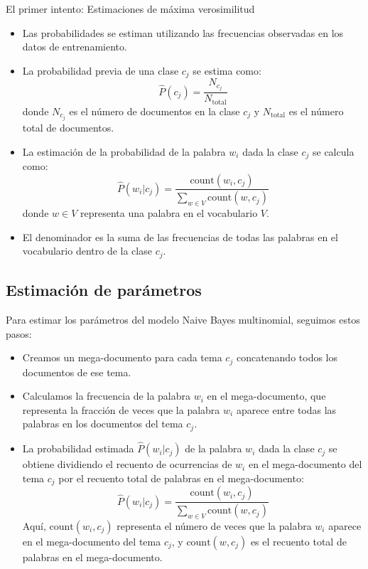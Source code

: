 El primer intento: Estimaciones de máxima verosimilitud
\begin{itemize}
    \item Las probabilidades se estiman utilizando las frecuencias observadas en los datos de entrenamiento.
    \item La probabilidad previa de una clase $c_j$ se estima como:
    \[
    \hat{P}(c_j) = \frac{N_{c_j}}{N_{\text{total}}}
    \]
    donde $N_{c_j}$ es el número de documentos en la clase $c_j$ y $N_{\text{total}}$ es el número total de documentos.
    \item La estimación de la probabilidad de la palabra $w_i$ dada la clase $c_j$ se calcula como:
    \[
    \hat{P}(w_i | c_j) = \frac{{\text{count}(w_i, c_j)}}{\sum_{w\in V}{\text{count}(w, c_j)}}
    \]
    donde $w \in V$ representa una palabra en el vocabulario $V$.
    \item El denominador es la suma de las frecuencias de todas las palabras en el vocabulario dentro de la clase $c_j$.
\end{itemize}

\subsection{Estimación de parámetros}

Para estimar los parámetros del modelo Naive Bayes multinomial, seguimos estos pasos:

\begin{itemize}
  \item Creamos un mega-documento para cada tema $c_j$ concatenando todos los documentos de ese tema.
  \item Calculamos la frecuencia de la palabra $w_i$ en el mega-documento, que representa la fracción de veces que la palabra $w_i$ aparece entre todas las palabras en los documentos del tema $c_j$.
  \item La probabilidad estimada $\hat{P}(w_i | c_j)$ de la palabra $w_i$ dada la clase $c_j$ se obtiene dividiendo el recuento de ocurrencias de $w_i$ en el mega-documento del tema $c_j$ por el recuento total de palabras en el mega-documento:
  \[
  \hat{P}(w_i | c_j) = \frac{{\text{count}(w_i, c_j)}}{\sum_{w\in V}{\text{count}(w, c_j)}}
  \]
  Aquí, $\text{count}(w_i, c_j)$ representa el número de veces que la palabra $w_i$ aparece en el mega-documento del tema $c_j$, y $\text{count}(w, c_j)$ es el recuento total de palabras en el mega-documento.
\end{itemize}

